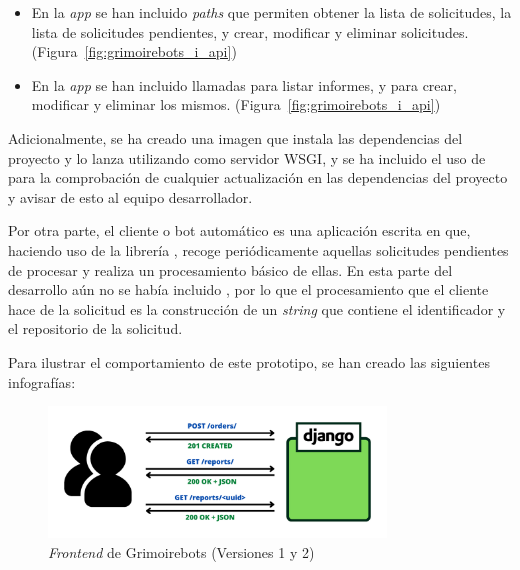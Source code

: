 \begin{itemize}
    \item En la \emph{app}  se han incluido \emph{paths} que permiten obtener la lista de solicitudes, la lista de solicitudes pendientes, y crear, modificar y eliminar solicitudes. (Figura~\ref{fig:grimoirebots_i_api})
    \item En la \emph{app}  se han incluido llamadas para listar informes, y para crear, modificar y eliminar los mismos. (Figura~\ref{fig:grimoirebots_i_api})
\end{itemize}

Adicionalmente, se ha creado una imagen  que instala las dependencias del proyecto y lo lanza utilizando  como servidor WSGI, y se ha incluido el uso de  para la comprobación de cualquier actualización en las dependencias del proyecto y avisar de esto al equipo desarrollador.

Por otra parte, el cliente o bot automático es una aplicación escrita en  que, haciendo uso de la librería , recoge periódicamente aquellas solicitudes pendientes de procesar y realiza un procesamiento básico de ellas. En esta parte del desarrollo aún no se había incluido , por lo que el procesamiento que el cliente hace de la solicitud es la construcción de un \emph{string} que contiene el identificador y el repositorio de la solicitud.

Para ilustrar el comportamiento de este prototipo, se han creado las siguientes infografías:

\begin{figure}[ht]
    \centering
    \includegraphics[width=0.8\textwidth]{Figures/grimoirebots_frontend}
    \decoRule
    \caption[Grimoirebots (\emph{Frontend})]{\emph{Frontend} de Grimoirebots (Versiones 1 y 2)}
    \label{fig:grimoirebots_frontend}
\end{figure}

